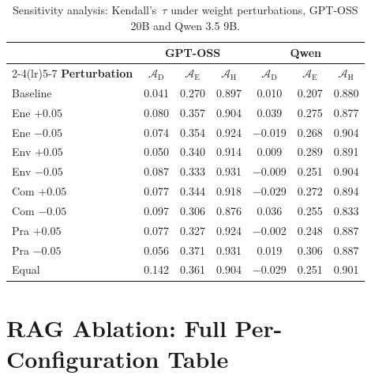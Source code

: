 \documentclass[final,3p,times]{elsarticle}
\begin{document}
\begin{table}[t]
\small
\centering
\renewcommand{\arraystretch}{1.10}
\caption{Sensitivity analysis: Kendall's~$\tau$ under weight perturbations, GPT-OSS 20B and Qwen 3.5 9B.}
\label{tab:sensitivity_gptoss}
\label{tab:sensitivity_qwen}
\begin{tabular}{@{}l ccc ccc@{}}
\toprule
 & \multicolumn{3}{c}{GPT-OSS} & \multicolumn{3}{c}{Qwen} \\
\cmidrule(lr){2-4}\cmidrule(lr){5-7}
\textbf{Perturbation} & $\mathcal{A}_{\text{D}}$ & $\mathcal{A}_{\text{E}}$ & $\mathcal{A}_{\text{H}}$ & $\mathcal{A}_{\text{D}}$ & $\mathcal{A}_{\text{E}}$ & $\mathcal{A}_{\text{H}}$ \\
\midrule
Baseline      & 0.041 & 0.270 & 0.897 & 0.010 & 0.207 & 0.880 \\
Ene $+0.05$   & 0.080 & 0.357 & 0.904 & 0.039 & 0.275 & 0.877 \\
Ene $-0.05$   & 0.074 & 0.354 & 0.924 & $-$0.019 & 0.268 & 0.904 \\
Env $+0.05$   & 0.050 & 0.340 & 0.914 & 0.009 & 0.289 & 0.891 \\
Env $-0.05$   & 0.087 & 0.333 & 0.931 & $-$0.009 & 0.251 & 0.904 \\
Com $+0.05$   & 0.077 & 0.344 & 0.918 & $-$0.029 & 0.272 & 0.894 \\
Com $-0.05$   & 0.097 & 0.306 & 0.876 & 0.036 & 0.255 & 0.833 \\
Pra $+0.05$   & 0.077 & 0.327 & 0.924 & $-$0.002 & 0.248 & 0.887 \\
Pra $-0.05$   & 0.056 & 0.371 & 0.931 & 0.019 & 0.306 & 0.887 \\
Equal         & 0.142 & 0.361 & 0.904 & $-$0.029 & 0.251 & 0.901 \\
\bottomrule
\end{tabular}
\renewcommand{\arraystretch}{1.0}
\end{table}

\section{RAG Ablation: Full Per-Configuration Table}
\label{app:rag_ablation_full}
\end{document}
